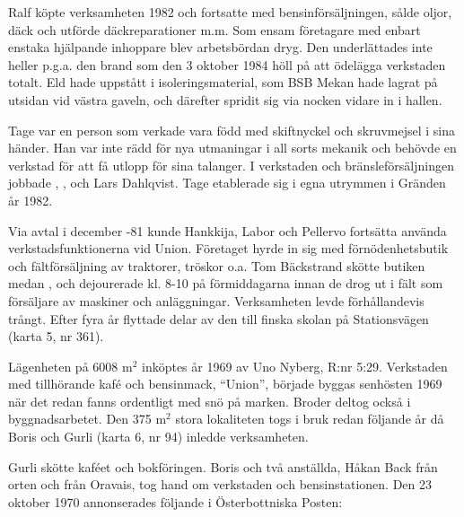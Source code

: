 Ralf köpte verksamheten 1982 och fortsatte med bensinförsäljningen, sålde oljor, däck och utförde däckreparationer m.m. Som ensam företagare med enbart enstaka hjälpande inhoppare blev arbetsbördan dryg.	Den underlättades inte heller p.g.a. den brand som den 3 oktober 1984 höll på att ödelägga verkstaden totalt. Eld hade uppstått i isoleringsmaterial, som BSB Mekan hade lagrat på utsidan vid västra	gaveln, och därefter spridit sig via nocken vidare in i hallen.


Tage var en person som verkade vara född med skiftnyckel och skruvmejsel i sina händer. Han var inte rädd för nya utmaningar i all sorts mekanik och behövde en verkstad för att få utlopp för sina talanger. I verkstaden och bränsleförsäljningen jobbade , ,  och Lars Dahlqvist. Tage etablerade sig i egna 	utrymmen i Gränden år 1982.


Via avtal i december -81 kunde Hankkija, Labor och Pellervo fortsätta använda verkstadsfunktionerna vid Union. Företaget hyrde in sig med förnödenhetsbutik och fältförsäljning av traktorer, tröskor o.a. Tom Bäckstrand skötte butiken medan ,  och  dejourerade kl. 8-10 på förmiddagarna innan de drog ut i fält som försäljare av maskiner och anläggningar. Verksamheten levde förhållandevis trångt. Efter fyra år flyttade delar av den till finska skolan på Stationsvägen (karta 5,  nr 361).




Lägenheten på 6008 m$^2$ inköptes år 1969 av Uno Nyberg, R:nr 5:29. Verkstaden med tillhörande kafé och bensinmack, ``Union'', började	byggas senhösten 1969 när det redan fanns ordentligt med snö på marken. Broder  deltog också i byggnadsarbetet. Den 375 m$^2$ stora lokaliteten togs i bruk redan följande år då Boris och Gurli	(karta 6, nr 94) inledde verksamheten.

Gurli skötte kaféet och bokföringen. Boris och två anställda, Håkan Back från orten och  från Oravais, tog hand om verkstaden och bensinstationen. Den 23 oktober 1970 annonserades följande i Österbottniska Posten:



